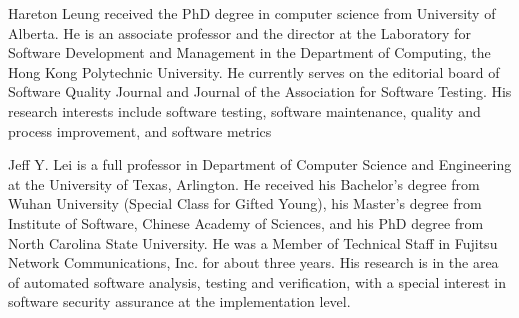 \documentclass[10pt,journal,cspaper,compsoc]{IEEEtran}
\begin{document}
\begin{IEEEbiography}{Hareton Leung}
received the PhD degree in computer science from University of Alberta. He is an associate professor and the director at the Laboratory for Software Development and Management in the Department of Computing, the Hong Kong Polytechnic University. He currently serves on the editorial board of Software Quality Journal and Journal of the Association for Software Testing. His research interests include software testing, software maintenance, quality and process improvement, and software metrics
\end{IEEEbiography}

\begin{IEEEbiography}{Jeff Y. Lei}
is a full professor in Department of Computer Science and Engineering at the University of Texas, Arlington. He received his Bachelor's degree from Wuhan University (Special Class for Gifted Young), his Master's degree from Institute of Software, Chinese Academy of Sciences, and his PhD degree from North Carolina State University. He was a Member of Technical Staff in Fujitsu Network Communications, Inc. for about three years. His research is in the area of automated software analysis, testing and verification, with a special interest in software security assurance at the implementation level.
\end{IEEEbiography}
\end{document}
